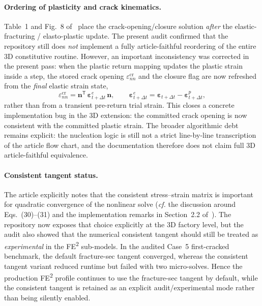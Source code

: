 \paragraph{Ordering of plasticity and crack kinematics.}
Table~1 and Fig.~8 of~\cite{KoBathe2026} place the crack-opening/closure
solution \emph{after} the elastic-fracturing / elasto-plastic update.  The
present audit confirmed that the repository still does \emph{not} implement a
fully article-faithful reordering of the entire 3D constitutive routine.
However, an important inconsistency was corrected in the present pass: when the
plastic return mapping updates the plastic strain inside a step, the stored
crack opening
\(\varepsilon_{nn}^{\mathrm{cr}}\)
and the closure flag are now refreshed from the \emph{final} elastic strain
state,
\begin{equation}
  \varepsilon_{nn}^{\mathrm{cr}}
  =
  \mathbf{n}^{\mathsf T}\,\boldsymbol{\varepsilon}^{e}_{t+\Delta t}\,\mathbf{n},
  \qquad
  \boldsymbol{\varepsilon}^{e}_{t+\Delta t}
  =
  \boldsymbol{\varepsilon}_{t+\Delta t}
  -
  \boldsymbol{\varepsilon}^{p}_{t+\Delta t},
\end{equation}
rather than from a transient pre-return trial strain.  This closes a concrete
implementation bug in the 3D extension: the committed crack opening is now
consistent with the committed plastic strain.  The broader algorithmic debt
remains explicit: the nucleation logic is still not a strict line-by-line
transcription of the article flow chart, and the documentation therefore does
not claim full 3D article-faithful equivalence.

\paragraph{Consistent tangent status.}
The article explicitly notes that the consistent stress--strain matrix is
important for quadratic convergence of the nonlinear solve
(\emph{cf.} the discussion around Eqs.~(30)--(31) and the implementation
remarks in Section~2.2 of~\cite{KoBathe2026}).  The repository now exposes that
choice explicitly at the 3D factory level, but the audit also showed that the
numerical consistent tangent should still be treated as \emph{experimental} in
the FE\textsuperscript{2} sub-models.  In the audited Case~5 first-cracked
benchmark, the default fracture-sec tangent converged, whereas the consistent
tangent variant reduced runtime but failed with two micro-solves.  Hence the
production FE\textsuperscript{2} profile continues to use the fracture-sec
tangent by default, while the consistent tangent is retained as an explicit
audit/experimental mode rather than being silently enabled.

